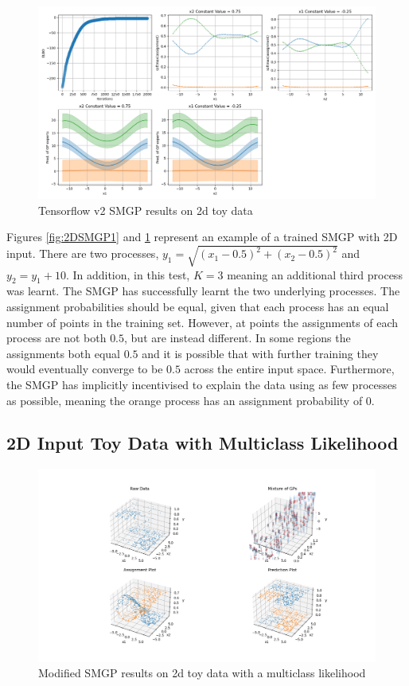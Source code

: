 \documentclass[12pt,a4paper]{report}
\theoremstyle{definition}
\begin{document}
\begin{figure}[H]
    \centering
    \includegraphics[width=\linewidth]{demo_tf2_2d_2.png}
    \caption{Tensorflow v2 SMGP results on 2d toy data}
    \label{fig:2DSMGP2}
\end{figure}

Figures \ref{fig:2DSMGP1} and \ref{fig:2DSMGP2} represent an example of a trained SMGP with 2D input. 
There are two processes, $y_{1} = \sqrt{(x_{1} - 0.5)^2 + (x_{2} - 0.5)^2}$ and $y_{2} = y_{1} + 10$.
In addition, in this test, $K = 3$ meaning an additional third process was learnt.
The SMGP has successfully learnt the two underlying processes.
The assignment probabilities should be equal, given that each process has an equal number of points in the training set. 
However, at points the assignments of each process are not both $0.5$, but are instead different.
In some regions the assignments both equal $0.5$ and it is possible that with further training they would eventually converge to be $0.5$ across the entire input space.
Furthermore, the SMGP has implicitly incentivised to explain the data using as few processes as possible, meaning the orange process has an assignment probability of 0.

\subsection{2D Input Toy Data with Multiclass Likelihood}

\begin{figure}[H]
    \centering
    \includegraphics[width=\linewidth]{demo_tf2_2d_modified_multiclass_1.png}
    \caption{Modified SMGP results on 2d toy data with a multiclass likelihood}
    \label{fig:2DMulticlassSMGPModified1}
\end{figure}
\end{document}
